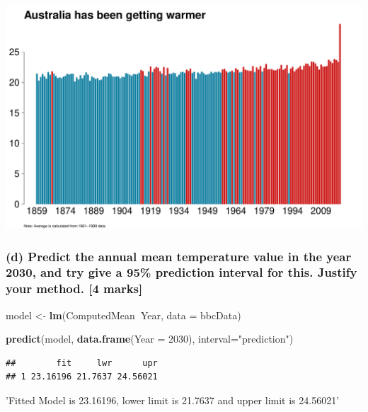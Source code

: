 \documentclass[]{article}
\newenvironment{Shaded}{\begin{snugshade}}{\end{snugshade}}
\newcommand{\KeywordTok}[1]{\textcolor[rgb]{0.13,0.29,0.53}{\textbf{#1}}}
\newcommand{\DataTypeTok}[1]{\textcolor[rgb]{0.13,0.29,0.53}{#1}}
\newcommand{\DecValTok}[1]{\textcolor[rgb]{0.00,0.00,0.81}{#1}}
\newcommand{\StringTok}[1]{\textcolor[rgb]{0.31,0.60,0.02}{#1}}
\newcommand{\OperatorTok}[1]{\textcolor[rgb]{0.81,0.36,0.00}{\textbf{#1}}}
\newcommand{\NormalTok}[1]{#1}
\begin{document}
\includegraphics{Assignment3_files/figure-latex/unnamed-chunk-8-1.pdf}

\subsubsection{(d) Predict the annual mean temperature value in the year
2030, and try give a 95\% prediction interval for this. Justify your
method. {[}4
marks{]}}\label{d-predict-the-annual-mean-temperature-value-in-the-year-2030-and-try-give-a-95-prediction-interval-for-this.-justify-your-method.-4-marks}

\begin{Shaded}
\begin{Highlighting}[]
\NormalTok{model <-}\StringTok{ }\KeywordTok{lm}\NormalTok{(ComputedMean}\OperatorTok{~}\NormalTok{Year, }\DataTypeTok{data =}\NormalTok{ bbcData)}

\KeywordTok{predict}\NormalTok{(model, }\KeywordTok{data.frame}\NormalTok{(}\DataTypeTok{Year =} \DecValTok{2030}\NormalTok{), }\DataTypeTok{interval=}\StringTok{"prediction"}\NormalTok{)}
\end{Highlighting}
\end{Shaded}

\begin{verbatim}
##        fit     lwr      upr
## 1 23.16196 21.7637 24.56021
\end{verbatim}

\begin{Shaded}
\begin{Highlighting}[]
\StringTok{'Fitted Model is 23.16196, lower limit is 21.7637 and upper limit is 24.56021'}
\end{Highlighting}
\end{Shaded}
\end{document}
